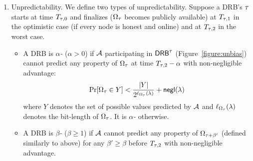 \begin{definition}
\begin{enumerate}
\item Unpredictability.
We define two types of unpredictability.
Suppose a DRB's \epoch $\tau$ starts at time $T_{\tau, 0}$ and finalizes ($\Omega_\tau$ becomes publicly available) at $T_{\tau, 1}$ in the optimistic case (if every node is honest and online) and at $T_{\tau, 2}$ in the worst case.
\begin{itemize}
\item A DRB is \textit{$\alpha$-\intraunpredictable} ($\alpha > 0$) if $\mathcal{A}$ participating in $\mathsf{DRB}^\tau$ (Figure~\ref{figure:unbias}) cannot predict any property of $\Omega_\tau$ at time $T_{\tau, 2} - \alpha$ with non-negligible advantage:
\begin{equation*}
\Pr[\Omega_\tau \in Y] < \frac{|Y|}{2^{\ell_{\Omega_\tau}(\lambda)}} + \mathsf{negl}(\lambda)
\end{equation*}
where $Y$ denotes the set of possible values predicted by $\mathcal{A}$ and $\ell_{\Omega_\tau}(\lambda)$ denotes the bit-length of $\Omega_\tau$.
It is \textit{$\alpha$-\intrapredictable} otherwise.
\item A DRB is \textit{$\beta$-\interunpredictable} ($\beta \geq 1$) if $\mathcal{A}$ cannot predict any property of $\Omega_{\tau + \beta'}$ (defined similarly to above) for any $\beta' \geq \beta$ before $T_{\tau, 2}$ with non-negligible advantage.
\end{itemize}
\end{enumerate}
\end{definition}

